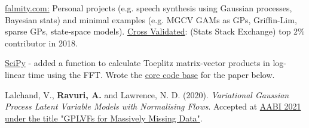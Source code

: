 

\begin{cvskills}

  {\href{https://www.falmity.com}{falmity.com:} Personal projects (e.g. speech synthesis using Gaussian processes, Bayesian stats) and minimal examples (e.g. MGCV GAMs as GPs, Griffin-Lim, sparse GPs, state-space models). \href{https://stats.stackexchange.com/users/211930/infprobscix}{Cross Validated}: (Stats Stack Exchange) top 2\% contributor in 2018.}

  {\href{https://github.com/scipy/scipy/blob/v1.6.0/scipy/linalg/basic.py}{SciPy} - added a function to calculate Toeplitz matrix-vector products in log-linear time using the FFT. \newline Wrote the \href{https://github.com/InfProbSciX/GPLVFs}{core code base} for the paper below.}

  {Lalchand, V., \textbf{Ravuri, A.} and Lawrence, N. D. (2020). \textit{Variational Gaussian Process Latent Variable Models with Normalising Flows}. Accepted at \href{https://openreview.net/pdf?id=zaMwvOjsyym}{AABI 2021 under the title "GPLVFs for Massively Missing Data"}.}


\end{cvskills}




